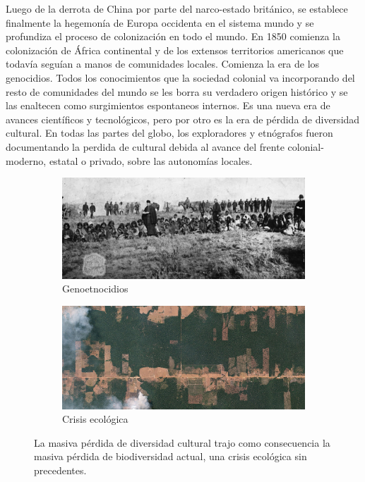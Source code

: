 \documentclass[a4paper,10pt]{book}
\begin{document}

Luego de la derrota de China por parte del narco-estado británico, se establece finalmente la hegemonía de Europa occidenta en el sistema mundo y se profundiza el proceso de colonización en todo el mundo. %
En 1850 comienza la colonización de África continental y de los extensos territorios americanos que todavía seguían a manos de comunidades locales.
Comienza la era de los genocidios.
Todos los conocimientos que la sociedad colonial va incorporando del resto de comunidades del mundo se les borra su verdadero origen histórico y se las enaltecen como surgimientos espontaneos internos.
Es una nueva era de avances científicos y tecnológicos, pero por otro es la era de pérdida de diversidad cultural.
En todas las partes del globo, los exploradores y etnógrafos fueron documentando la perdida de cultural debida al avance del frente colonial-moderno, estatal o privado, sobre las autonomías locales.

\begin{figure}[ht!]
    \centering
    \begin{subfigure}[b]{0.48\textwidth}
    \includegraphics[width=\linewidth]{static/genocidio_patagonia}
    \caption{Genoetnocidios}
    \label{fig:genocidio_patagonia}
    \end{subfigure}
    \begin{subfigure}[b]{0.47\textwidth}
    \includegraphics[width=\linewidth]{static/deforestation-brazil}
    \caption{Crisis ecológica}
    \label{fig:deforestation-brazil}
    \end{subfigure}
    \caption{
    La masiva pérdida de diversidad cultural trajo como consecuencia la masiva pérdida de biodiversidad actual, una crisis ecológica sin precedentes.
    }
    \label{fig:cultural-lose}
\end{figure}
\end{document}
